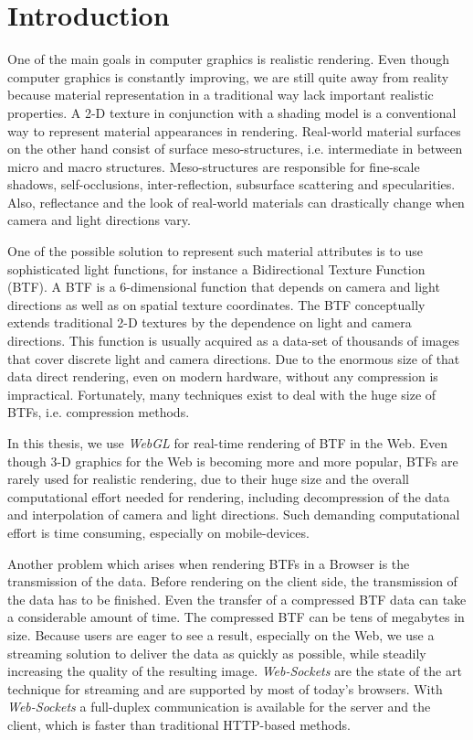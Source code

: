 \chapter{Introduction}
\label{chapter:introduction}

One of the main goals in computer graphics is realistic rendering. 
Even though computer graphics is constantly improving, we are still quite away from reality because material representation in a traditional way lack important realistic properties. 
A 2-D texture in conjunction with a shading model is a conventional way to represent material appearances in rendering.
Real-world material surfaces on the other hand consist of surface meso-structures, i.e. intermediate in between micro and macro structures.
Meso-structures are responsible for fine-scale shadows, self-occlusions, inter-reflection, subsurface scattering and specularities.
Also, reflectance and the look of real-world materials can drastically change when camera and light directions vary.

One of the possible solution to represent such material attributes is to use sophisticated light functions, for instance a Bidirectional Texture Function (BTF). 
 A BTF is a 6-dimensional function that depends on camera and light directions as well as on spatial texture coordinates. 
The BTF conceptually extends traditional 2-D textures by the dependence on light and camera directions.
This function is usually acquired as a data-set of thousands of images that cover discrete light and camera directions.
Due to the enormous size of that data direct rendering, even on modern hardware, without any compression is impractical.
Fortunately, many techniques exist to deal with the huge size of BTFs, i.e. compression methods.


In this thesis, we use \emph{WebGL} for real-time rendering of BTF in the Web.
Even though 3-D graphics for the Web is becoming more and more popular, BTFs are rarely used for realistic rendering, due to their huge size and the overall computational effort needed for rendering,
including decompression of the data and interpolation of camera and light directions.
Such demanding computational effort is time consuming, especially on mobile-devices.

Another problem which arises when rendering BTFs in a Browser is the transmission of the data.
Before rendering on the client side, the transmission of the data has to be finished.
Even the transfer of a compressed BTF data can take a considerable amount of time. 
The compressed BTF can be tens of megabytes in size.
Because users are eager to see a result, especially on the Web, we use a streaming solution to deliver the data as quickly as possible, while steadily increasing the quality of the resulting image.
 \emph{Web-Sockets} are the state of the art technique for streaming and are supported by most of today's browsers.
With \emph{Web-Sockets}  a  full-duplex communication is available for the server and the client, which is faster than traditional HTTP-based methods. 


